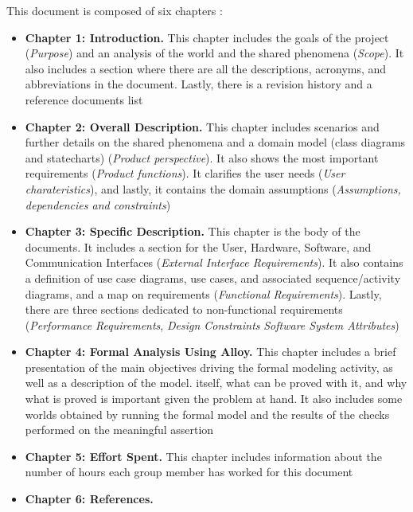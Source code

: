 This document is composed of six chapters :
\begin{itemize}
    \item \textbf{Chapter 1: Introduction.} This chapter includes the goals of the project (\textit{Purpose}) 
    and an analysis of the world and the shared phenomena (\textit{Scope}). It also includes a section where 
    there are all the descriptions, acronyms, and abbreviations in the document. Lastly, there 
    is a revision history and a reference documents list
    \item \textbf{Chapter 2: Overall Description.} This chapter includes scenarios and further
    details on the shared phenomena and a domain model (class diagrams and statecharts) (\textit{Product perspective}). It also
    shows the most important requirements (\textit{Product functions}). It clarifies the user needs (\textit{User charateristics}), and lastly, it contains 
    the domain assumptions (\textit{Assumptions, dependencies and constraints})
    \item \textbf{Chapter 3: Specific Description.} This chapter is the body of the documents. It includes a section for 
    the User, Hardware, Software, and Communication Interfaces (\textit{External Interface Requirements}). It also contains a definition
    of use case diagrams, use cases, and associated sequence/activity diagrams, and a map on requirements (\textit{Functional Requirements}).
    Lastly, there are three sections dedicated to non-functional requirements (\textit{Performance Requirements}, \textit{Design Constraints} \textit{Software System Attributes})
    \item \textbf{Chapter 4: Formal Analysis Using Alloy.} This chapter includes a brief presentation of the
    main objectives driving the formal modeling activity, as well as a description of the model.
    itself, what can be proved with it, and why what is proved is important given the problem at hand. It also includes some worlds obtained by running the
    formal model and the results of the checks performed on the meaningful assertion
    \item \textbf{Chapter 5: Effort Spent.}  This chapter includes information about the number of hours each group member has worked for this document
    \item \textbf{Chapter 6: References.}
\end{itemize}